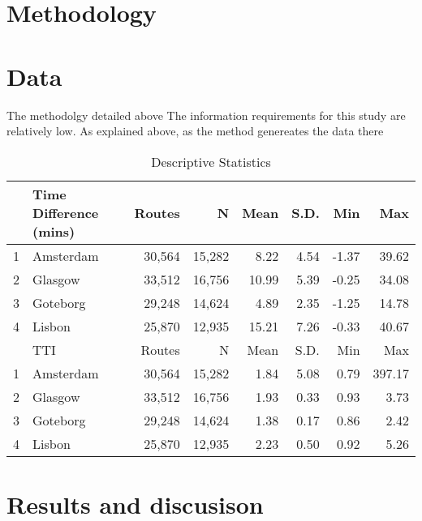 \documentclass[a4paper]{jpconf}
\begin{document}
\section{Methodology}

\section{Data}
\indent The methodolgy detailed above The information requirements for this study are relatively low. As explained above, as the method genereates the data there 


\begin{table}[ht]	
	\caption {Descriptive Statistics}
	\label{Results}
	\centering
	\begin{tabular}{rlrrrrrr}
		\hline
		& Time Difference (mins) & Routes & N & Mean & S.D. & Min & Max \\ 
		\hline
		1 & Amsterdam	& 30,564 & 15,282 & 8.22 	& 4.54 & -1.37 & 39.62 \\ 
		2 & Glasgow 	& 33,512 & 16,756 & 10.99 	& 5.39 & -0.25 & 34.08 \\ 
		3 & Goteborg 	& 29,248 & 14,624 & 4.89 	& 2.35 & -1.25 & 14.78 \\ 
		4 & Lisbon 		& 25,870 & 12,935 & 15.21 	& 7.26 & -0.33 & 40.67 \\
		
		\hline
		& TTI & Routes &  N & Mean & S.D. & Min & Max \\ 
		\hline
		1 & Amsterdam & 30,564 & 15,282 & 1.84 & 5.08 & 0.79 & 397.17 \\ 
		2 & Glasgow   & 33,512 & 16,756 & 1.93 & 0.33 & 0.93 & 3.73 \\ 
		3 & Goteborg  & 29,248 & 14,624 & 1.38 & 0.17 & 0.86 & 2.42 \\ 
		4 & Lisbon    & 25,870 & 12,935 & 2.23 & 0.50 & 0.92 & 5.26 \\ 
		\hline
	\end{tabular}
\end{table}




\section{Results and discusison}
\end{document}
